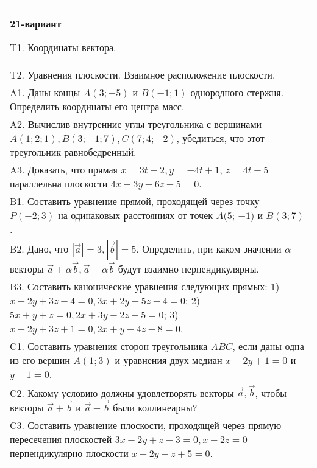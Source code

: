 \documentclass{article}
\begin{document}
\begin{tabular}{m{17cm}}
\textbf{21-вариант}
\newline

T1. 
Координаты вектора.
 \\
T2. 
Уравнения плоскости. Взаимное расположение плоскости.
 \\
A1. Даны концы \(A(3; - 5)\) и \(B( - 1;1)\) однородного стержня. Определить координаты его центра масс.
 \\
A2. 
Вычислив внутренние углы треугольника с вершинами \(A(1;2;1),B(3; - 1;7),C(7;4; - 2)\), убедиться, что этот треугольник равнобедренный.
 \\
A3. 
Доказать, что прямая \(x = 3t - 2,y = - 4t + 1\), \(z = 4t - 5\) параллельна плоскости \(4x - 3y - 6z - 5 = 0\).
 \\
B1. 
Составить уравнение прямой, проходящей через точку \(P( - 2;3)\) на одинаковых расстояниях от точек \(A(5\); \(- 1)\) и \(B(3;7)\).
 \\
B2. 
Дано, что \(|\overrightarrow{a}| = 3,|\overrightarrow{b}| = 5\). Определить, при каком значении \(\alpha\) векторы \(\overrightarrow{a} + \alpha\overrightarrow{b},\overrightarrow{a} - \alpha\overrightarrow{b}\) будут взаимно перпендикулярны.
 \\
B3. 
Составить канонические уравнения следующих прямых: 1) \(x - 2y + 3z - 4 = 0,3x + 2y - 5z - 4 = 0\); 2) \(5x + y + z = 0,2x + 3y - 2z + 5 = 0\); 3) \(x - 2y + 3z + 1 = 0,2x + y - 4z - 8 = 0\).
 \\
C1. 
Составить уравнения сторон треугольника \(ABC\), если даны одна из его вершин \(A(1;3)\) и уравнения двух медиан \(x - 2y + 1 = 0\) и \(y - 1 = 0\).
 \\
C2. 
Какому условию должны удовлетворять векторы \(\overrightarrow{a},\overrightarrow{b}\), чтобы векторы \(\overrightarrow{a} + \overrightarrow{b}\) и \(\overrightarrow{a} - \overrightarrow{b}\) были коллинеарны?
 \\
C3. 
Составить уравнение плоскости, проходящей через прямую пересечения плоскостей \(3x - 2y + z - 3 = 0,x - 2z = 0\) перпендикулярно плоскости \(x - 2y + z + 5 = 0\).
 \\

\end{tabular}
\vspace{1cm}
\end{document}
